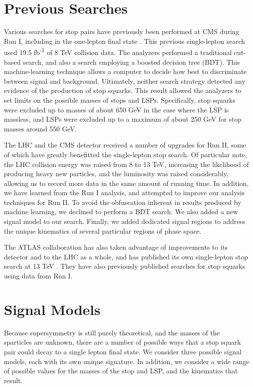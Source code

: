 \section{Previous Searches}
\label{sec:stop:run1}

Various searches for stop pairs have previously been performed at CMS
during Run I, including in the one-lepton final state
\cite{run1stop1l}. This previous single-lepton search used 19.5
fb\textsuperscript{-1} of 8 TeV collision data. The analyzers performed a traditional
cut-based search, and also a search employing a boosted decision tree
(BDT). This machine-learning technique allows a computer to decide how best
to discriminate between signal and background. Ultimately, neither search
strategy detected any evidence of the production of stop squarks. This
result allowed the analyzers to set limits on the possible masses of
stops and LSPs. Specifically, stop squarks were excluded up to masses
of about 650 GeV in the case where the LSP is massless, and LSPs were
excluded up to a maximum of about 250 GeV for stop masses around 550 GeV.

The LHC and the CMS detector received a number of upgrades for Run II,
some of which have greatly benefitted the single-lepton stop
search. Of particular note, the LHC collision energy was raised from 8
to 13 TeV, increasing the likelihood of producing heavy new
particles, and the luminosity was raised considerably, allowing us %
to record more data in the same amount of running time. In addition,
we have learned from the Run I analysis, and attempted to improve our
analysis techniques for Run II. To avoid the obfuscation inherent in
results produced by machine learning, we declined to perform a BDT
search. We also added a new signal model to our search. Finally, we
added dedicated signal regions to address the unique kinematics of
several particular regions of phase space.

The ATLAS collaboration has also taken advantage of improvements to
its detector and to the LHC as a whole, and has published its own
single-lepton stop search at 13 TeV \cite{stop1latlas13}. They
have also previously published searches for stop squarks using data
from Run I.

\section{Signal Models}
\label{sec:stop:sigmodels}

Because supersymmetry is still purely theoretical, and the masses
of the sparticles are unknown, there are a number of possible
ways that a stop squark pair could decay to a single lepton final
state. We consider three possible signal models, each with its own
unique signature. In addition, we consider a wide range of possible
values for the masses of the stop and LSP, and the kinematics that result.

